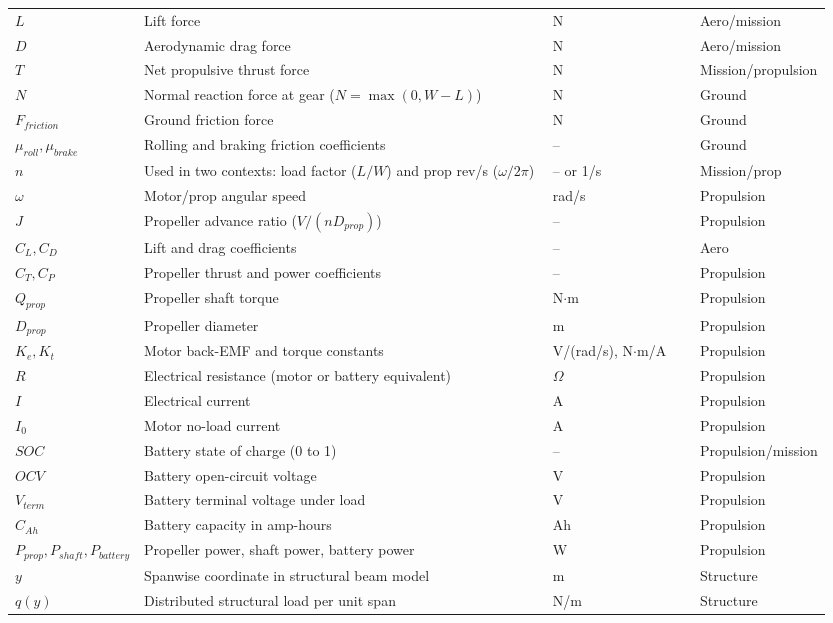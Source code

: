 ﻿\documentclass[11pt]{article}
\begin{document}
\begin{longtable}{p{0.15\linewidth} p{0.50\linewidth} p{0.18\linewidth} p{0.12\linewidth}}
\(L\) & Lift force & N & Aero/mission \\
\(D\) & Aerodynamic drag force & N & Aero/mission \\
\(T\) & Net propulsive thrust force & N & Mission/propulsion \\
\(N\) & Normal reaction force at gear (\(N=\max(0,W-L)\)) & N & Ground \\
\(F_{friction}\) & Ground friction force & N & Ground \\
\(\mu_{roll}, \mu_{brake}\) & Rolling and braking friction coefficients & -- & Ground \\
\(n\) & Used in two contexts: load factor (\(L/W\)) and prop rev/s (\(\omega/2\pi\)) & -- or 1/s & Mission/prop \\
\(\omega\) & Motor/prop angular speed & rad/s & Propulsion \\
\(J\) & Propeller advance ratio (\(V/(nD_{prop})\)) & -- & Propulsion \\
\(C_L, C_D\) & Lift and drag coefficients & -- & Aero \\
\(C_T, C_P\) & Propeller thrust and power coefficients & -- & Propulsion \\
\(Q_{prop}\) & Propeller shaft torque & N\(\cdot\)m & Propulsion \\
\(D_{prop}\) & Propeller diameter & m & Propulsion \\
\(K_e, K_t\) & Motor back-EMF and torque constants & V/(rad/s), N\(\cdot\)m/A & Propulsion \\
\(R\) & Electrical resistance (motor or battery equivalent) & \(\Omega\) & Propulsion \\
\(I\) & Electrical current & A & Propulsion \\
\(I_0\) & Motor no-load current & A & Propulsion \\
\(SOC\) & Battery state of charge (0 to 1) & -- & Propulsion/mission \\
\(OCV\) & Battery open-circuit voltage & V & Propulsion \\
\(V_{term}\) & Battery terminal voltage under load & V & Propulsion \\
\(C_{Ah}\) & Battery capacity in amp-hours & Ah & Propulsion \\
\(P_{prop},P_{shaft},P_{battery}\) & Propeller power, shaft power, battery power & W & Propulsion \\
\(y\) & Spanwise coordinate in structural beam model & m & Structure \\
\(q(y)\) & Distributed structural load per unit span & N/m & Structure \\

\end{longtable}
\end{document}
